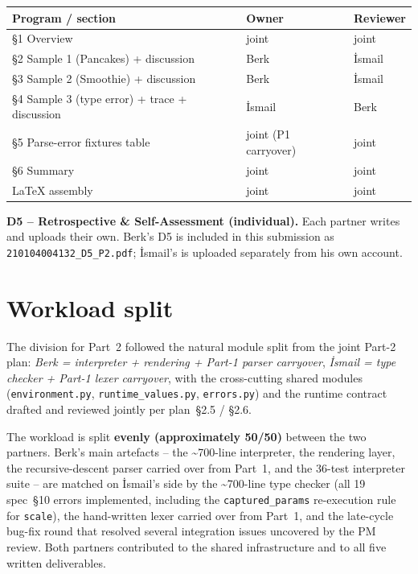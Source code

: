 \documentclass[11pt,a4paper]{article}
\begin{document}
\begin{center}
\small
\begin{tabular}{@{}p{}p{}p{}@{}}
\toprule
\textbf{Program / section} & \textbf{Owner} & \textbf{Reviewer} \\
\midrule
\S1 Overview                                     & joint             & joint  \\
\S2 Sample 1 (Pancakes) + discussion             & Berk              & İsmail \\
\S3 Sample 2 (Smoothie) + discussion             & Berk              & İsmail \\
\S4 Sample 3 (type error) + trace + discussion   & İsmail            & Berk   \\
\S5 Parse-error fixtures table                   & joint (P1 carryover) & joint \\
\S6 Summary                                      & joint             & joint  \\
LaTeX assembly                                   & joint             & joint  \\
\bottomrule
\end{tabular}
\end{center}

\noindent\textbf{D5 -- Retrospective \& Self-Assessment (individual).}
Each partner writes and uploads their own. Berk's D5 is included in
this submission as \texttt{210104004132\_D5\_P2.pdf}; İsmail's is
uploaded separately from his own account.

\section{Workload split}

The division for Part~2 followed the natural module split from the
joint Part-2 plan: \emph{Berk = interpreter + rendering + Part-1
parser carryover}, \emph{İsmail = type checker + Part-1 lexer
carryover}, with the cross-cutting shared modules
(\texttt{environment.py}, \texttt{runtime\_values.py},
\texttt{errors.py}) and the runtime contract drafted and reviewed
jointly per plan~\S2.5 / \S2.6.

\medskip
\noindent The workload is split \textbf{evenly (approximately 50/50)}
between the two partners. Berk's main artefacts -- the
\textasciitilde 700-line interpreter, the rendering layer, the
recursive-descent parser carried over from Part~1, and the
36-test interpreter suite -- are matched on İsmail's side by the
\textasciitilde 700-line type checker (all 19 spec~\S10 errors
implemented, including the \texttt{captured\_params} re-execution
rule for \texttt{scale}), the hand-written lexer carried over from
Part~1, and the late-cycle bug-fix round that resolved several
integration issues uncovered by the PM review. Both partners
contributed to the shared infrastructure and to all five written
deliverables.
\end{document}

